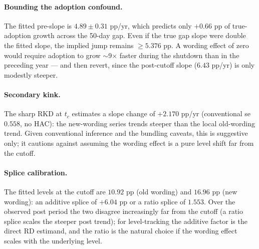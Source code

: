 \documentclass[11pt]{article}
\begin{document}
\paragraph{Bounding the adoption confound.} The fitted pre-slope is
$4.89 \pm 0.31$ pp/yr, which predicts only $+0.66$ pp of true-adoption growth
across the 50-day gap. Even if the true gap slope were double the fitted
slope, the implied jump remains $\geq 5.376$ pp. A wording effect of zero
would require adoption to grow $\sim$9$\times$ faster during the shutdown
than in the preceding year --- and then revert, since the post-cutoff slope
($6.43$ pp/yr) is only modestly steeper.

\paragraph{Secondary kink.} The sharp RKD at $t_c$ estimates a slope change
of $+2.170$ pp/yr (conventional se $0.558$, no HAC): the new-wording series
trends steeper than the local old-wording trend. Given conventional
inference and the bundling caveats, this is suggestive only; it cautions
against assuming the wording effect is a pure level shift far from the
cutoff.

\paragraph{Splice calibration.} The fitted levels at the cutoff are $10.92$
pp (old wording) and $16.96$ pp (new wording): an additive splice of
$+6.04$ pp or a ratio splice of $1.553$. Over the observed post period the
two disagree increasingly far from the cutoff (a ratio splice scales the
steeper post trend); for level-tracking the additive factor is the direct RD
estimand, and the ratio is the natural choice if the wording effect scales
with the underlying level.
\end{document}
